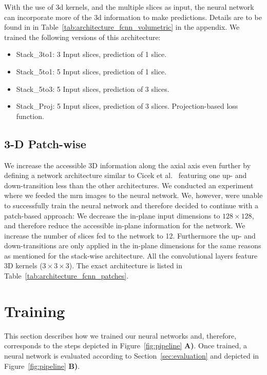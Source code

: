 With the use of \gls{3d} kernels, and the multiple slices as input, the neural network can incorporate more of the \gls{3d} information to make predictions.
Details are to be found in in Table~\ref{tab:architecture_fcnn_volumetric} in the appendix. We trained the following versions of this architecture:
\begin{itemize}
  \item Stack\_3to1: 3 Input slices, prediction of 1 slice.
  \item Stack\_5to1: 5 Input slices, prediction of 1 slice.
  \item Stack\_5to3: 5 Input slices, prediction of 3 slices.
  \item Stack\_Proj: 5 Input slices, prediction of 3 slices. Projection-based loss function.
\end{itemize}


\subsection{3-D Patch-wise}
We increase the accessible 3D information along the axial axis even further by defining a network architecture similar to Cicek et al.~\cite{Cicek20163DAnnotation} featuring one up- and down-transition less than the other architectures. We conducted an experiment where we feeded the \gls{mrn} images to the neural network. We, however, were unable to successfully train the neural network and therefore decided to continue with a patch-based approach: We decrease the in-plane input dimensions to $128 \times 128$, and therefore reduce the accessible in-plane information for the network. We increase the number of slices fed to the network to 12. Furthermore the up- and down-transitions are only applied in the in-plane dimensions for the same reasons as mentioned for the stack-wise architecture. All the convolutional layers feature 3D kernels ($3 \times 3 \times 3$). The exact architecture is listed in Table~\ref{tab:architecture_fcnn_patches}.

\section{Training} \label{sec:training}
This section describes how we trained our neural networks and, therefore, corresponds to the steps depicted in Figure~\ref{fig:pipeline} \textbf{A)}. Once trained, a neural network is evaluated according to Section~\ref{sec:evaluation} and depicted in Figure~\ref{fig:pipeline} \textbf{B)}.

